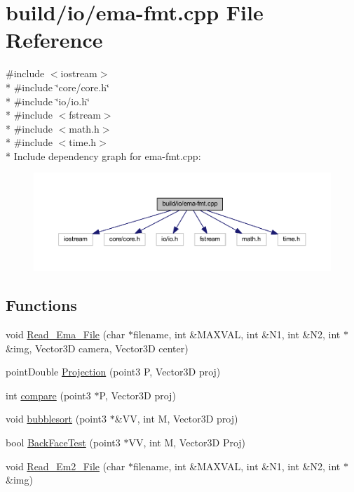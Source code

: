 \hypertarget{ema-fmt_8cpp}{\section{build/io/ema-\/fmt.cpp File Reference}
\label{ema-fmt_8cpp}
}
{\ttfamily \#include $<$iostream$>$}\\*
{\ttfamily \#include \char`\"{}core/core.\-h\char`\"{}}\\*
{\ttfamily \#include \char`\"{}io/io.\-h\char`\"{}}\\*
{\ttfamily \#include $<$fstream$>$}\\*
{\ttfamily \#include $<$math.\-h$>$}\\*
{\ttfamily \#include $<$time.\-h$>$}\\*
Include dependency graph for ema-\/fmt.cpp\-:
\nopagebreak
\begin{figure}[H]
\begin{center}
\leavevmode
\includegraphics[width=350pt]{ema-fmt_8cpp__incl}
\end{center}
\end{figure}
\subsection*{Functions}
\begin{DoxyCompactItemize}
\item 
void \hyperlink{ema-fmt_8cpp_aa9ffd74e448df044ddd3c15b202cb9df}{Read\-\_\-\-Ema\-\_\-\-File} (char $\ast$filename, int \&M\-A\-X\-V\-A\-L, int \&N1, int \&N2, int $\ast$\&img, Vector3\-D camera, Vector3\-D center)
\item 
point\-Double \hyperlink{ema-fmt_8cpp_ac1d53d9bdaa9cd148e63ec89f5c5cfe0}{Projection} (point3 P, Vector3\-D proj)
\item 
int \hyperlink{ema-fmt_8cpp_a20725ac53f6720e2d8861abfc1dde5c9}{compare} (point3 $\ast$P, Vector3\-D proj)
\item 
void \hyperlink{ema-fmt_8cpp_a8fdeaf22db4641c22cc3711035267392}{bubblesort} (point3 $\ast$\&V\-V, int M, Vector3\-D proj)
\item 
bool \hyperlink{ema-fmt_8cpp_aa0f292641e20d262acae6cd3bf4dc26d}{Back\-Face\-Test} (point3 $\ast$V\-V, int M, Vector3\-D Proj)
\item 
void \hyperlink{ema-fmt_8cpp_a1e1b8e60938ac30930d080833004acf1}{Read\-\_\-\-Em2\-\_\-\-File} (char $\ast$filename, int \&M\-A\-X\-V\-A\-L, int \&N1, int \&N2, int $\ast$\&img)
\end{DoxyCompactItemize}


